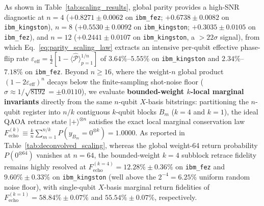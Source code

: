 \documentclass[aps,pra,reprint,superscriptaddress,floatfix,nofootinbib]{revtex4-2}
\begin{document}
\begin{enumerate}
    As shown in Table~\ref{tab:scaling_results}, global parity provides a high-SNR diagnostic at $n = 4$ ($+0.8271 \pm 0.0062$ on \texttt{ibm\_fez}; $+0.6738 \pm 0.0082$ on \texttt{ibm\_kingston}), $n = 8$ ($+0.5530 \pm 0.0092$ on \texttt{ibm\_kingston}; $+0.3035 \pm 0.0105$ on \texttt{ibm\_fez}), and $n = 12$ ($+0.2441 \pm 0.0107$ on \texttt{ibm\_kingston}, a $>22\sigma$ signal), from which Eq.~\eqref{eq:parity_scaling_law} extracts an intensive per-qubit effective phase-flip rate $\varepsilon_{\text{eff}} = \frac{1}{2}[1 - \langle\hat{\mathcal{P}}\rangle_{p=1}^{1/n}]$ of $3.64\%$--$5.55\%$ on \texttt{ibm\_kingston} and $2.34\%$--$7.18\%$ on \texttt{ibm\_fez}. Beyond $n \ge 16$, where the weight-$n$ global product $(1 - 2\varepsilon_{\text{eff}})^n$ decays below the finite-sampling shot-noise floor ($\sigma \approx 1/\sqrt{8192} = \pm 0.0110$), we evaluate \textbf{bounded-weight $k$-local marginal invariants} directly from the same $n$-qubit $X$-basis bitstrings: partitioning the $n$-qubit register into $n/k$ contiguous $k$-qubit blocks $B_m$ ($k = 4$ and $k = 1$), the ideal QAOA retrace state $|+\rangle^{\otimes n}$ satisfies the exact local marginal conservation law $F_{\text{echo}}^{(k)} \equiv \frac{k}{n}\sum_{m=1}^{n/k} P(y_{B_m} = 0^{\otimes k}) = 1.0000$. As reported in Table~\ref{tab:deconvolved_scaling}, whereas the global weight-64 return probability $P(0^{\otimes 64})$ vanishes at $n = 64$, the bounded-weight $k = 4$ subblock retrace fidelity remains highly resolved at $F_{\text{echo}}^{(k=4)} = 12.28\% \pm 0.36\%$ on \texttt{ibm\_fez} and $9.60\% \pm 0.33\%$ on \texttt{ibm\_kingston} (well above the $2^{-4} = 6.25\%$ uniform random noise floor), with single-qubit $X$-basis marginal return fidelities of $F_{\text{echo}}^{(k=1)} = 58.84\% \pm 0.07\%$ and $55.54\% \pm 0.07\%$, respectively.


\end{enumerate}
\end{document}
